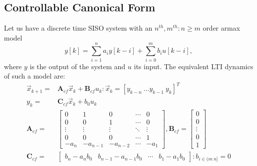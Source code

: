 \documentclass[runningheads,a4paper]{llncs}
\newcommand{\mat}[1]{\boldsymbol{#1}}
\begin{document}
\subsection{Controllable Canonical Form} \label{sec:reachable}

Let us have a discrete time SISO system with an $n^{th},m^{th} : n\geq m$ order armax model
$$y[k]=\sum_{i=1}^n a_iy[k-i]+\sum_{i=0}^m b_iu[k-i],$$
where $y$ is the output of the system and $u$ its input.
The equivalent LTI dynamics of such a model are:
\begin{align}
\label{eq:cf_SISO}
\vec{x}_{k+1}=&\mat{A}_{cf}\vec{x}_k+\mat{B}_{cf}u_k : \vec{x}_k=[y_{k-n}\ \hdots y_{k-1}\ y_{k}]^T\\
y_k=&\mat{C}_{cf}\vec{x}_k + b_0u_k\nonumber\\
\mat{A}_{cf}=&\left[
\begin{array}{ccccc}
0&1&0&\cdots&0\\
0&0&1&\cdots&0\\
\vdots&\vdots&\vdots&\ddots&\vdots\\
0&0&0&\cdots&1\\
-a_n&-a_{n-1}&-a_{n-2}&\cdots&-a_1
\end{array}\right],
\mat{B}_{cf}=\left[
\begin{array}{c}
0\\0\\ \vdots\\ 0\\ 1
\end{array}\right]\nonumber\\
\mat{C}_{cf}=&[\begin{array}{ccccc}b_n-a_nb_0&b_{n-1}-a_{n-1}b_0&\cdots&b_1-a_1b_0\end{array}] : b_{i \in (m\ n]}=0\nonumber
\end{align}
\end{document}
